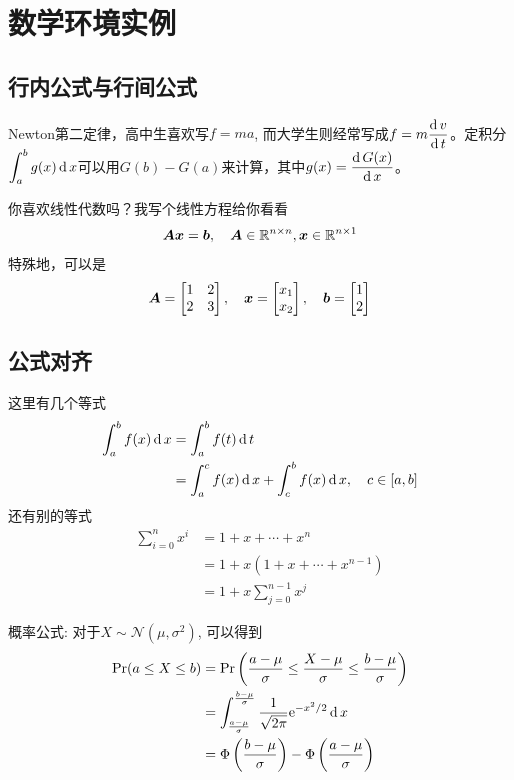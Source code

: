\section{数学环境实例}

\subsection{行内公式与行间公式}

Newton第二定律，高中生喜欢写$f=ma$, 而大学生则经常写成$\displaystyle{f=m\frac{\operatorname{\mathrm{d}}{v}}{\operatorname{\mathrm{d}}{t}}}$。定积分
$\displaystyle{\int^b_a g(x)\operatorname{\mathrm{d}}x}$可以用$G(b)-G(a)$来计算，其中$\displaystyle g(x) = \frac{\operatorname{\mathrm{d}} {G(x)}}{\operatorname{\mathrm{d}} {x}}$。

你喜欢线性代数吗？我写个线性方程给你看看
\begin{equation}
\bm{A} \bm{x}= \bm{b}, \quad \bm{A}\in \mathbb{R}^{{n}\times {n}}, \bm{x}\in \mathbb{R}^{{n}\times {1}}
\end{equation}
特殊地，可以是
\begin{equation}
\bm{A} = \begin{bmatrix}
1 & 2 \\
2 & 3 
\end{bmatrix},\quad
\bm{x}=\begin{bmatrix}
x_1 \\ x_2
\end{bmatrix}, \quad
\bm{b} =\begin{bmatrix}
1 \\ 2
\end{bmatrix}
\end{equation}

\subsection{公式对齐}

这里有几个等式
\begin{equation}
\begin{split}
\int^b_a f(x)\operatorname{\mathrm{d}} x 
& = \int^b_a f(t)\operatorname{\mathrm{d}} t \\
& = \int^c_a f(x)\operatorname{\mathrm{d}} x + \int^b_c f(x)\operatorname{\mathrm{d}} x, \quad c\in [a,b] 
\end{split}
\end{equation}
还有别的等式
\begin{align}
\sum^n_{i=0} x^i 
&= 1 + x + \cdots + x^n \\
&= 1 + x(1 + x + \cdots + x^{n-1}) \\
& = 1 + x \sum^{n-1}_{j=0} x^j
\end{align}

概率公式: 对于$X\sim \mathcal{N}(\mu, \sigma^2)$, 可以得到
\begin{align}
\operatorname{\mathrm{Pr}}(a \le X \le b) 
&=\operatorname{\mathrm{Pr}}\left(\frac{a-\mu}{\sigma}\le \frac{X-\mu}{\sigma}\le
  \frac{b-\mu}{\sigma} \right) \\
&= \int^{\frac{b-\mu}{\sigma}}_{\frac{a-\mu}{\sigma}} \frac{1}{\sqrt{2\pi}}\mathrm{e}^{-x^2/2}\operatorname{\mathrm{d}} x \\
& = \Phi\left(\frac{b-\mu}{\sigma}\right) - \Phi\left(\frac{a-\mu}{\sigma}\right) 
\end{align}


